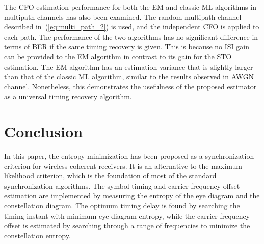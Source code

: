 \documentclass[12pt, draftclsnofoot, onecolumn]{IEEEtran}
\begin{document}
The CFO estimation performance for both the EM and classic ML algorithms in multipath channels has also been examined.
The random multipath channel described in~(\ref{eq:multi_path_2}) is used,
and the independent CFO is applied to each path.
The performance of the two algorithms has no significant difference in terms of BER if the same timing recovery is given.
This is because no ISI gain can be provided to the EM algorithm in contrast to its gain for the STO estimation.
The EM algorithm has an estimation variance that is slightly larger than that of the classic ML algorithm, similar to the results observed in AWGN channel.
Nonetheless, this demonstrates the usefulness of the proposed estimator as a universal timing recovery algorithm.
% 
% 



\section{Conclusion}
\label{sec:conc}
In this paper, the entropy minimization has been proposed as a synchronization criterion for wireless coherent receivers.
It is an alternative to the maximum likelihood criterion, which is the foundation of most of the standard synchronization algorithms. 
The symbol timing and carrier frequency offset estimation are implemented by measuring the entropy of the eye diagram and the constellation diagram.
% 
% 
The optimum timing delay is found by searching the timing instant with minimum eye diagram entropy, while the carrier frequency offset is estimated by searching through a range of frequencies to minimize the constellation entropy.  
\end{document}
